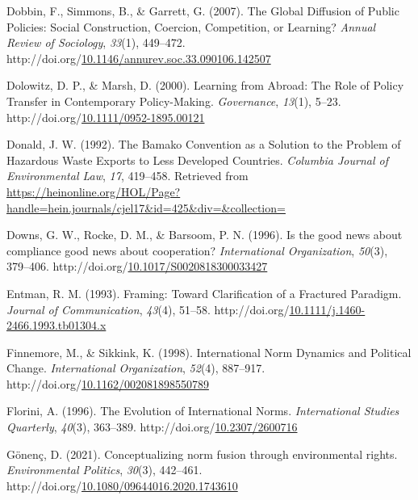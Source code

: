 \documentclass[12pt]{ulaval}
\newenvironment{CSLReferences}%
  {}%
  {\par}
\begin{document}
\begin{CSLReferences}{1}{0}
Dobbin, F., Simmons, B., \& Garrett, G. (2007). The {Global} {Diffusion} of {Public} {Policies}: {Social} {Construction}, {Coercion}, {Competition}, or {Learning}? \emph{Annual Review of Sociology}, \emph{33}(1), 449--472. http://doi.org/\href{https://doi.org/10.1146/annurev.soc.33.090106.142507}{10.1146/annurev.soc.33.090106.142507}

Dolowitz, D. P., \& Marsh, D. (2000). Learning from {Abroad}: {The} {Role} of {Policy} {Transfer} in {Contemporary} {Policy}-{Making}. \emph{Governance}, \emph{13}(1), 5--23. http://doi.org/\href{https://doi.org/10.1111/0952-1895.00121}{10.1111/0952-1895.00121}

Donald, J. W. (1992). The {Bamako} {Convention} as a {Solution} to the {Problem} of {Hazardous} {Waste} {Exports} to {Less} {Developed} {Countries}. \emph{Columbia Journal of Environmental Law}, \emph{17}, 419--458. Retrieved from \url{https://heinonline.org/HOL/Page?handle=hein.journals/cjel17&id=425&div=&collection=}

Downs, G. W., Rocke, D. M., \& Barsoom, P. N. (1996). Is the good news about compliance good news about cooperation? \emph{International Organization}, \emph{50}(3), 379--406. http://doi.org/\href{https://doi.org/10.1017/S0020818300033427}{10.1017/S0020818300033427}

Entman, R. M. (1993). Framing: {Toward} {Clarification} of a {Fractured} {Paradigm}. \emph{Journal of Communication}, \emph{43}(4), 51--58. http://doi.org/\href{https://doi.org/10.1111/j.1460-2466.1993.tb01304.x}{10.1111/j.1460-2466.1993.tb01304.x}

Finnemore, M., \& Sikkink, K. (1998). International {Norm} {Dynamics} and {Political} {Change}. \emph{International Organization}, \emph{52}(4), 887--917. http://doi.org/\href{https://doi.org/10.1162/002081898550789}{10.1162/002081898550789}

Florini, A. (1996). The {Evolution} of {International} {Norms}. \emph{International Studies Quarterly}, \emph{40}(3), 363--389. http://doi.org/\href{https://doi.org/10.2307/2600716}{10.2307/2600716}

Gönenç, D. (2021). Conceptualizing norm fusion through environmental rights. \emph{Environmental Politics}, \emph{30}(3), 442--461. http://doi.org/\href{https://doi.org/10.1080/09644016.2020.1743610}{10.1080/09644016.2020.1743610}


\end{CSLReferences}
\end{document}
